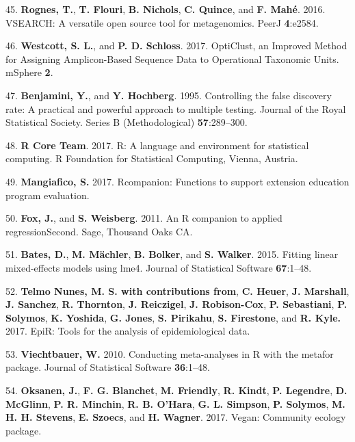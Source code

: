 \documentclass[12pt,]{article}
\begin{document}
\hypertarget{ref-rognes_vsearch_2016}{}
45. \textbf{Rognes, T.}, \textbf{T. Flouri}, \textbf{B. Nichols},
\textbf{C. Quince}, and \textbf{F. Mahé}. 2016. VSEARCH: A versatile
open source tool for metagenomics. PeerJ \textbf{4}:e2584.

\hypertarget{ref-westcott_opticlust_2017}{}
46. \textbf{Westcott, S. L.}, and \textbf{P. D. Schloss}. 2017.
OptiClust, an Improved Method for Assigning Amplicon-Based Sequence Data
to Operational Taxonomic Units. mSphere \textbf{2}.

\hypertarget{ref-benjamini_controlling_1995}{}
47. \textbf{Benjamini, Y.}, and \textbf{Y. Hochberg}. 1995. Controlling
the false discovery rate: A practical and powerful approach to multiple
testing. Journal of the Royal Statistical Society. Series B
(Methodological) \textbf{57}:289--300.

\hypertarget{ref-r_citation_2017}{}
48. \textbf{R Core Team}. 2017. R: A language and environment for
statistical computing. R Foundation for Statistical Computing, Vienna,
Austria.

\hypertarget{ref-rcompanion_citation_2017}{}
49. \textbf{Mangiafico, S.} 2017. Rcompanion: Functions to support
extension education program evaluation.

\hypertarget{ref-car_citation_2011}{}
50. \textbf{Fox, J.}, and \textbf{S. Weisberg}. 2011. An R companion to
applied regressionSecond. Sage, Thousand Oaks CA.

\hypertarget{ref-lme4_citation_2015}{}
51. \textbf{Bates, D.}, \textbf{M. Mächler}, \textbf{B. Bolker}, and
\textbf{S. Walker}. 2015. Fitting linear mixed-effects models using
lme4. Journal of Statistical Software \textbf{67}:1--48.

\hypertarget{ref-epir_citation_2017}{}
52. \textbf{Telmo Nunes, M. S. with contributions from}, \textbf{C.
Heuer}, \textbf{J. Marshall}, \textbf{J. Sanchez}, \textbf{R. Thornton},
\textbf{J. Reiczigel}, \textbf{J. Robison-Cox}, \textbf{P. Sebastiani},
\textbf{P. Solymos}, \textbf{K. Yoshida}, \textbf{G. Jones}, \textbf{S.
Pirikahu}, \textbf{S. Firestone}, and \textbf{R. Kyle.} 2017. EpiR:
Tools for the analysis of epidemiological data.

\hypertarget{ref-metafor_citation_2010}{}
53. \textbf{Viechtbauer, W.} 2010. Conducting meta-analyses in R with
the metafor package. Journal of Statistical Software \textbf{36}:1--48.

\hypertarget{ref-vegan_citation_2017}{}
54. \textbf{Oksanen, J.}, \textbf{F. G. Blanchet}, \textbf{M. Friendly},
\textbf{R. Kindt}, \textbf{P. Legendre}, \textbf{D. McGlinn}, \textbf{P.
R. Minchin}, \textbf{R. B. O'Hara}, \textbf{G. L. Simpson}, \textbf{P.
Solymos}, \textbf{M. H. H. Stevens}, \textbf{E. Szoecs}, and \textbf{H.
Wagner}. 2017. Vegan: Community ecology package.
\end{document}
